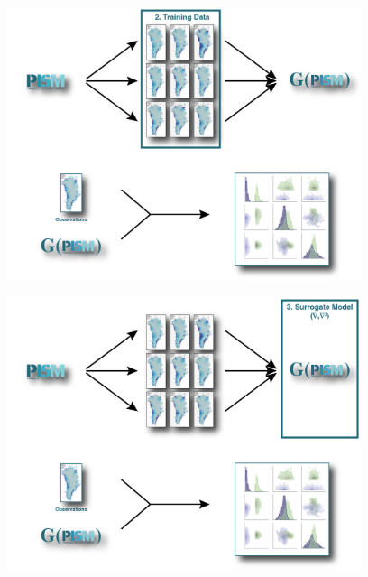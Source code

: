 \documentclass[hide notes,intlimits]{beamer}
\begin{document}
\begin{frame}{}
  \vspace{-1.5em}
    \begin{minipage}[t][8.2cm][t]{\textwidth}
    \begin{figure}
      \includegraphics[height=8cm]{surrogate_model_2}
    \end{figure}
    \end{minipage}
\end{frame}

\begin{frame}{}
  \vspace{-1.5em}
    \begin{minipage}[t][8.2cm][t]{\textwidth}
    \begin{figure}
      \includegraphics[height=8cm]{surrogate_model_3}
    \end{figure}
    \end{minipage}
\end{frame}
\end{document}
